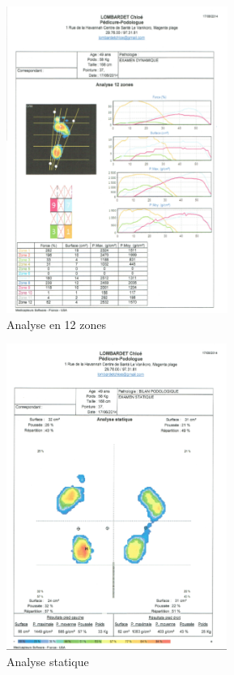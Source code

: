 \begin{figure}[H]
  \centering
  \begin{subfigure}[b]{0.4\linewidth}
    \centering
    \includegraphics[width=\textwidth, height=10cm]{images/analyse_12_zone.png}
    \caption{Analyse en 12 zones}
    \label{fig:analyse_12_zone}
  \end{subfigure}
  \hspace{0.03\textwidth}
  \begin{subfigure}[b]{0.4\linewidth}
    \centering
    \includegraphics[width=\textwidth, height=10cm]{images/analyse_statique.png}
    \caption{Analyse statique}
    \label{fig:analyse_statique}
  \end{subfigure}
  \begin{subfigure}[b]{0.4\linewidth}

\end{subfigure}
\end{figure}
